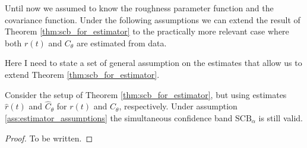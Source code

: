 Until now we assumed to know the roughness parameter function and the covariance
function. Under the following assumptions we can extend the result of Theorem
\ref{thm:scb_for_estimator} to the practically more relevant case where both $r(t)$ and
$C_\theta$ are estimated from data.

\begin{assumption}
    \label{ass:estimator_assumptions}
    Here I need to state a set of general assumption on the estimates that allow us to
    extend Theorem \ref{thm:scb_for_estimator}.
\end{assumption}

\begin{theorem}
    \label{thm:main_theorem}
    Consider the setup of Theorem \ref{thm:scb_for_estimator}, but using estimates
    $\hat{r}(t)$ and $\hat{C}_\theta$ for $r(t)$ and $C_\theta$, respectively. Under
    assumption \ref{ass:estimator_assumptions} the simultaneous confidence band
    $\text{SCB}_\alpha$ is still valid.
\end{theorem}
\begin{proof}
    To be written.
\end{proof}
